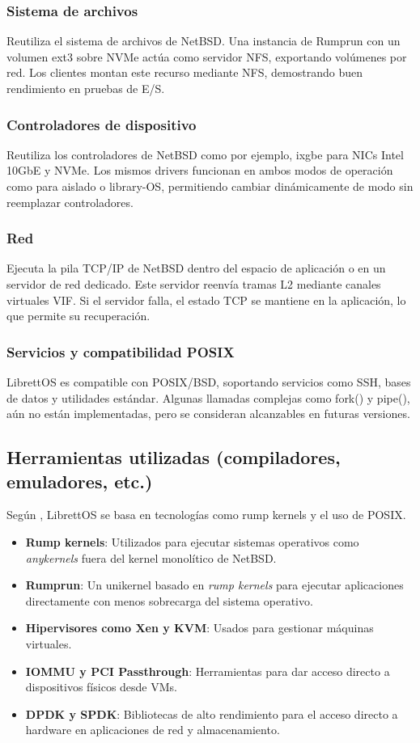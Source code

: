 \subsubsection{Sistema de archivos}
Reutiliza el sistema de archivos de NetBSD. Una instancia de Rumprun con un volumen ext3 sobre NVMe actúa como servidor NFS, exportando volúmenes por red. Los clientes montan este recurso mediante NFS, demostrando buen rendimiento en pruebas de E/S.
\subsubsection{Controladores de dispositivo}
 Reutiliza los controladores de NetBSD como por ejemplo, ixgbe para NICs Intel 10GbE y NVMe. Los mismos drivers funcionan en ambos modos de operación como para aislado o library-OS, permitiendo cambiar dinámicamente de modo sin reemplazar controladores.
 \subsubsection{Red}
Ejecuta la pila TCP/IP de NetBSD dentro del espacio de aplicación o en un servidor de red dedicado. Este servidor reenvía tramas L2 mediante canales virtuales VIF. Si el servidor falla, el estado TCP se mantiene en la aplicación, lo que permite su recuperación.
\subsubsection{Servicios y compatibilidad POSIX} 
LibrettOS es compatible con POSIX/BSD, soportando servicios como SSH, bases de datos y utilidades estándar. Algunas llamadas complejas como fork() y pipe(), aún no están implementadas, pero se consideran alcanzables en futuras versiones.
\subsection{Herramientas utilizadas (compiladores, emuladores, etc.)}
Según \citep{nikolaev2021librettos}, LibrettOS se basa en tecnologías como rump kernels y el uso de POSIX.

\begin{itemize}
    \item \textbf{Rump kernels}: Utilizados para ejecutar sistemas operativos como \textit{anykernels} fuera del kernel monolítico de NetBSD.
    \item \textbf{Rumprun}: Un unikernel basado en \textit{rump kernels} para ejecutar aplicaciones directamente con menos sobrecarga del sistema operativo.
    \item \textbf{Hipervisores como Xen y KVM}: Usados para gestionar máquinas virtuales.
    \item \textbf{IOMMU y PCI Passthrough}: Herramientas para dar acceso directo a dispositivos físicos desde VMs.
    \item \textbf{DPDK y SPDK}: Bibliotecas de alto rendimiento para el acceso directo a hardware en aplicaciones de red y almacenamiento.
\end{itemize}


